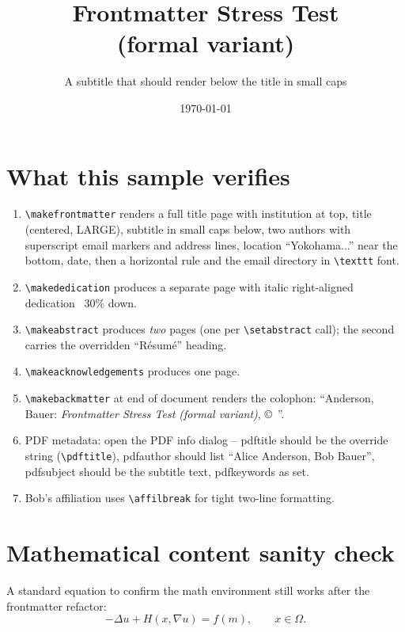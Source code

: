 \documentclass{e_class_noteLong}
\title{Frontmatter Stress Test \\ (formal variant)}
\subtitle{A subtitle that should render below the title in small caps}
\date{\today}
\begin{document}
\makefrontmatter
\makededication
\makeabstract
\makeacknowledgements

\chapter{What this sample verifies}

\begin{enumerate}
  \item \texttt{\textbackslash makefrontmatter} renders a full title
        page with institution at top, title (centered, LARGE), subtitle
        in small caps below, two authors with superscript email markers
        and address lines, location ``Yokohama...'' near the bottom,
        date, then a horizontal rule and the email directory in
        \texttt{\textbackslash texttt} font.
  \item \texttt{\textbackslash makededication} produces a separate page
        with italic right-aligned dedication ~30\% down.
  \item \texttt{\textbackslash makeabstract} produces \emph{two} pages
        (one per \texttt{\textbackslash setabstract} call); the second
        carries the overridden ``R\'esum\'e'' heading.
  \item \texttt{\textbackslash makeacknowledgements} produces one page.
  \item \texttt{\textbackslash makebackmatter} at end of document
        renders the colophon: ``Anderson, Bauer: \emph{Frontmatter
        Stress Test (formal variant)}, \copyright\ \the\year''.
  \item PDF metadata: open the PDF info dialog -- pdftitle should be
        the override string (\texttt{\textbackslash pdftitle}),
        pdfauthor should list ``Alice Anderson, Bob Bauer'',
        pdfsubject should be the subtitle text, pdfkeywords as set.
  \item Bob's affiliation uses \texttt{\textbackslash affilbreak} for
        tight two-line formatting.
\end{enumerate}

\chapter{Mathematical content sanity check}

A standard equation to confirm the math environment still works after
the frontmatter refactor:
\[
  -\Delta u + H(x, \nabla u) = f(m), \qquad x \in \Omega.
\]

\makebackmatter
\end{document}
